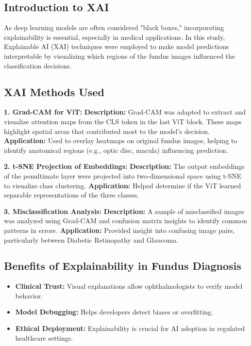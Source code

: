 \documentclass[a4paper,12pt]{report}
\begin{document}
\subsection{Introduction to XAI}

As deep learning models are often considered "black boxes," incorporating explainability is essential, especially in medical applications. In this study, Explainable AI (XAI) techniques were employed to make model predictions interpretable by visualizing which regions of the fundus images influenced the classification decisions.

\subsection{XAI Methods Used}

\textbf{1. Grad-CAM for ViT:}  
\textbf{Description:} Grad-CAM was adapted to extract and visualize attention maps from the CLS token in the last ViT block. These maps highlight spatial areas that contributed most to the model’s decision.  
\textbf{Application:} Used to overlay heatmaps on original fundus images, helping to identify anatomical regions (e.g., optic disc, macula) influencing prediction.

\vspace{0.3cm}
\textbf{2. t-SNE Projection of Embeddings:}  
\textbf{Description:} The output embeddings of the penultimate layer were projected into two-dimensional space using t-SNE to visualize class clustering.  
\textbf{Application:} Helped determine if the ViT learned separable representations of the three classes.

\vspace{0.3cm}
\textbf{3. Misclassification Analysis:}  
\textbf{Description:} A sample of misclassified images was analyzed using Grad-CAM and confusion matrix insights to identify common patterns in errors.  
\textbf{Application:} Provided insight into confusing image pairs, particularly between Diabetic Retinopathy and Glaucoma.

\subsection{Benefits of Explainability in Fundus Diagnosis}

\begin{itemize}
    \item \textbf{Clinical Trust:} Visual explanations allow ophthalmologists to verify model behavior.
    \item \textbf{Model Debugging:} Helps developers detect biases or overfitting.
    \item \textbf{Ethical Deployment:} Explainability is crucial for AI adoption in regulated healthcare settings.
\end{itemize}
\end{document}
